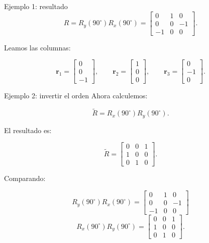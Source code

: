 \documentclass[aspectratio=169,10pt]{beamer}
\begin{document}
\begin{frame}{Ejemplo 1: resultado}
    \small
    \[
    R=R_y(90^\circ)R_x(90^\circ)
    =
    \begin{bmatrix}
        0&1&0\\
        0&0&-1\\
        -1&0&0
    \end{bmatrix}.
    \]

    Leamos las columnas:

    \[
    \boldsymbol{r}_1=\begin{bmatrix}0\\0\\-1\end{bmatrix},
    \qquad
    \boldsymbol{r}_2=\begin{bmatrix}1\\0\\0\end{bmatrix},
    \qquad
    \boldsymbol{r}_3=\begin{bmatrix}0\\-1\\0\end{bmatrix}.
    \]

\end{frame}

\begin{frame}{Ejemplo 2: invertir el orden}
    \small
    Ahora calculemos:

    \[
    \tilde{R}=R_x(90^\circ)R_y(90^\circ).
    \]

    El resultado es:

    \[
    \tilde{R}=
    \begin{bmatrix}
        0&0&1\\
        1&0&0\\
        0&1&0
    \end{bmatrix}.
    \]

    Comparando:

    \[
    R_y(90^\circ)R_x(90^\circ)
    =
    \begin{bmatrix}
        0&1&0\\
        0&0&-1\\
        -1&0&0
    \end{bmatrix}
    \]
\vspace{0.2cm}
    \[
    R_x(90^\circ)R_y(90^\circ)
    =
    \begin{bmatrix}
        0&0&1\\
        1&0&0\\
        0&1&0
    \end{bmatrix}.
    \]

\end{frame}
\end{document}
